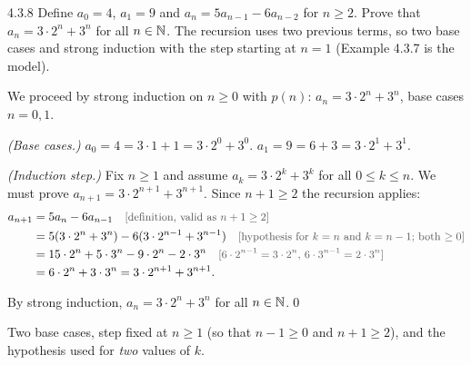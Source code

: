 \begin{bookex}[essential]{4.3.8}
Define $a_0=4$, $a_1=9$ and $a_n=5a_{n-1}-6a_{n-2}$ for $n\ge2$. Prove that $a_n=3\cdot2^n+3^n$ for all $n\in\mathbb{N}$.
\solution
\given The recursion uses two previous terms, so two base cases and strong induction with the step starting at $n=1$ (Example 4.3.7 is the model).
\begin{steps}
\item We proceed by strong induction on $n\ge0$ with $p(n)$: $a_n=3\cdot2^n+3^n$, base cases $n=0,1$.
\item \emph{(Base cases.)} $a_0=4=3\cdot1+1=3\cdot2^0+3^0$. $a_1=9=6+3=3\cdot2^1+3^1$.
\item \emph{(Induction step.)} Fix $n\ge1$ and assume $a_k=3\cdot2^k+3^k$ for all $0\le k\le n$. We must prove $a_{n+1}=3\cdot2^{n+1}+3^{n+1}$. Since $n+1\ge2$ the recursion applies:
\begin{align*}
a_{n+1}&=5a_n-6a_{n-1}\why{definition, valid as $n+1\ge2$}\\
&=5(3\cdot2^n+3^n)-6(3\cdot2^{n-1}+3^{n-1})\why{hypothesis for $k=n$ and $k=n-1$; both $\ge0$}\\
&=15\cdot2^n+5\cdot3^n-9\cdot2^n-2\cdot3^n\why{$6\cdot2^{n-1}=3\cdot2^n$, $6\cdot3^{n-1}=2\cdot3^n$}\\
&=6\cdot2^n+3\cdot3^n=3\cdot2^{n+1}+3^{n+1}.
\end{align*}
\end{steps}
\conclusion By strong induction, $a_n=3\cdot2^n+3^n$ for all $n\in\mathbb{N}$.\qed
\begin{compare}
\item Two base cases, step fixed at $n\ge1$ (so that $n-1\ge0$ and $n+1\ge2$), and the hypothesis used for \emph{two} values of $k$.
\end{compare}
\end{bookex}


